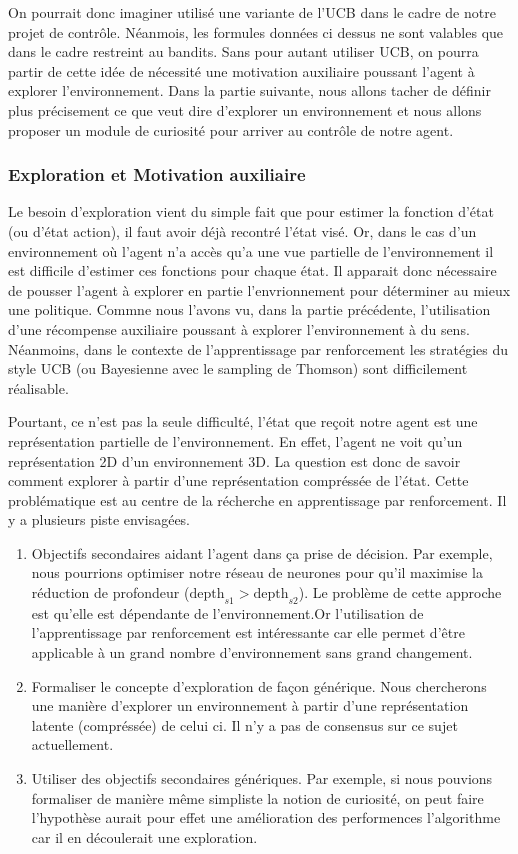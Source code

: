 On pourrait donc imaginer utilisé une variante de l'\gls{UCB} dans le cadre de notre projet de contrôle. Néanmois, les formules données ci dessus ne sont valables que dans le cadre restreint au bandits. 
Sans pour autant utiliser \gls{UCB}, on pourra partir de cette idée de nécessité une motivation auxiliaire poussant l'agent à explorer l'environnement. Dans la partie suivante, nous allons tacher de définir plus précisement ce que veut dire d'explorer un environnement et nous allons proposer un module de curiosité pour arriver au contrôle de notre agent.

\subsubsection{Exploration et Motivation auxiliaire}

Le besoin d'exploration vient du simple fait que pour estimer la fonction d'état (ou d'état action), il faut avoir déjà recontré l'état visé. Or, dans le cas d'un environnement où l'agent n'a accès qu'a une vue partielle de l'environnement il est difficile d'estimer ces fonctions pour chaque état. Il apparait donc nécessaire de pousser l'agent à explorer en partie l'envrionnement pour déterminer au mieux une politique. Commne nous l'avons vu, dans la partie précédente, l'utilisation d'une récompense auxiliaire poussant à explorer l'environnement à du sens. Néanmoins, dans le contexte de l'apprentissage par renforcement les stratégies du style UCB (ou Bayesienne avec le sampling de Thomson) sont difficilement réalisable.

Pourtant, ce n'est pas la seule difficulté, l'état que reçoit notre agent est une représentation partielle de l'environnement. En effet, l'agent ne voit qu'un représentation 2D d'un environnement 3D. La question est donc de savoir comment explorer à partir d'une représentation compréssée de l'état. Cette problématique est au centre de la récherche en apprentissage par renforcement. Il y a plusieurs piste envisagées.

\begin{enumerate}
    \item Objectifs secondaires aidant l'agent dans ça prise de décision. Par exemple, nous pourrions optimiser notre réseau de neurones pour qu'il maximise la réduction de profondeur ($\text{depth}_{s1} > \text{depth}_{s2}$). Le problème de cette approche est qu'elle est dépendante de l'environnement.Or l'utilisation de l'apprentissage par renforcement est intéressante car elle permet d'être applicable à un grand nombre d'environnement sans grand changement.
    \item Formaliser le concepte d'exploration de façon générique. Nous chercherons une manière d'explorer un environnement à partir d'une représentation latente (compréssée) de celui ci. Il n'y a pas de consensus sur ce sujet actuellement.

    \item Utiliser des objectifs secondaires génériques. Par exemple, si nous pouvions formaliser de manière même simpliste la notion de curiosité, on peut faire l'hypothèse aurait pour effet une amélioration des performences l'algorithme car il en découlerait une exploration.
\end{enumerate}

